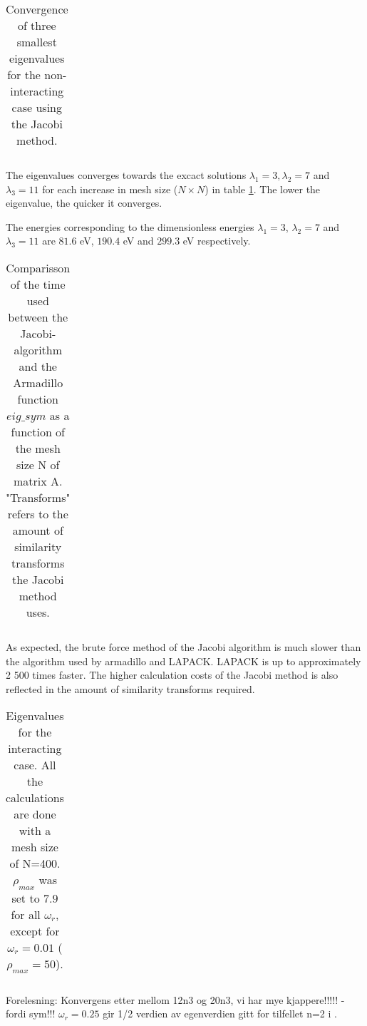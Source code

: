 
\begin{table}[H]\caption{Convergence of three smallest eigenvalues for the non-interacting case using the Jacobi method.}
	\label{tab:eigval}
	\begin{tabular}{cccc}
		
	\end{tabular}
\end{table}

The eigenvalues converges towards the excact solutions  $ \lambda_1=3, \lambda_2 =7  $ and $ \lambda_3 =11 $ for each increase in mesh size  ($ N\times N $) in table \ref{tab:eigval}. The lower the  eigenvalue, the quicker it converges. 

The energies corresponding to the dimensionless energies $\lambda_1 = 3 $, $\lambda_2 = 7 $ and $\lambda_3 = 11$ are $ 81.6 $ eV,  $ 190.4 $ eV and $ 299.3 $ eV respectively. 

\begin{table}[H]\caption{Comparisson of the time used between the Jacobi-algorithm and the Armadillo function  $eig\_sym$ as a function of the mesh size N of matrix A. "Transforms" refers to the amount of similarity transforms the Jacobi method uses.}
	\label{tab:time}
	\begin{tabular}{cccccc}
		
	\end{tabular}
\end{table}


As expected, the brute force method of the Jacobi algorithm is much slower than the algorithm used by armadillo and LAPACK. LAPACK is up to approximately 2 500 times faster. The higher calculation costs of the Jacobi method is also reflected in the amount of similarity transforms required.  


\begin{table}[H]\caption{Eigenvalues for the interacting case. All the calculations are done with a mesh size of N=400. $ \rho_{max} $ was set to $ 7.9 $ for all $ \omega_r $, except for $ \omega_r  = 0.01$ ( $ \rho_{max} =50$). }
	\label{tab:omega}
	\begin{tabular}{cccc}
		
	\end{tabular}
\end{table}

Forelesning: Konvergens etter mellom 12n3 og 20n3, vi har mye kjappere!!!!! - fordi sym!!!
$ \omega_r= 0.25 $ gir 1/2 verdien av egenverdien gitt for tilfellet n=2 i \cite{litterature}. 